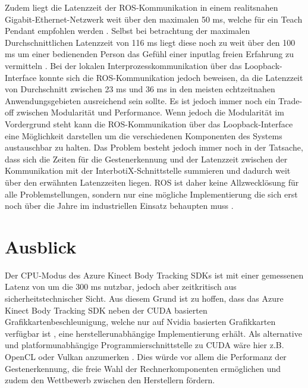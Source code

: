 Zudem liegt die Latenzzeit der ROS-Kommunikation in einem realitsnahen Gigabit-Ethernet-Netzwerk weit über den maximalen 50 ms, welche für ein Teach Pendant empfohlen werden \cite[55]{prassler_advances_2004}. Selbst bei betrachtung der maximalen Durchschnittlichen Latenzzeit von 116 ms liegt diese noch zu weit über den 100 ms um einer bedienenden Person das Gefühl einer inputlag freien Erfahrung zu vermitteln \cite{miller_response_1968}. Bei der lokalen Interprozesskommunikation über das Loopback-Interface konnte sich die ROS-Kommunikation jedoch beweisen, da die Latenzzeit von Durchschnitt zwischen 23 ms und 36 ms in den meisten echtzeitnahen Anwendungsgebieten ausreichend sein sollte. Es ist jedoch immer noch ein Trade-off zwischen Modularität und Performance. Wenn jedoch die Modularität im Vordergrund steht kann die ROS-Kommunikation über das Loopback-Interface eine Möglichkeit darstellen um die verschiedenen Komponenten des Systems austauschbar zu halten. Das Problem besteht jedoch immer noch in der Tatsache, dass sich die Zeiten für die Gestenerkennung und der Latenzzeit zwischen der Kommunikation mit der InterbotiX-Schnittstelle summieren und dadurch weit über den erwähnten Latenzzeiten liegen. ROS ist daher keine Allzwecklösung für alle Problemstellungen, sondern nur eine mögliche Implementierung die sich erst noch über die Jahre im industriellen Einsatz behaupten muss \cite{why_dont_we_use_ros_nodate}.

\section{Ausblick}
Der CPU-Modus des Azure Kinect Body Tracking SDKs ist mit einer gemessenen Latenz von um die 300 ms nutzbar, jedoch aber zeitkritisch aus sicherheitstechnischer Sicht. Aus diesem Grund ist zu hoffen, dass das Azure Kinect Body Tracking SDK neben der CUDA basierten Grafikkartenbeschleunigung, welche nur auf Nvidia basierten Grafikkarten verfügbar ist \cite{encausse_body_nodate}, eine herstellerunabhängige Implementierung erhält. Als alternative und platformunabhängige Programmierschnittstelle zu CUDA wäre hier z.B. OpenCL oder Vulkan anzumerken \cite{vulkan_api_2020}. Dies würde vor allem die Performanz der Gestenerkennung, die freie Wahl der Rechnerkomponenten ermöglichen und zudem den Wettbewerb zwischen den Herstellern fördern.\\

